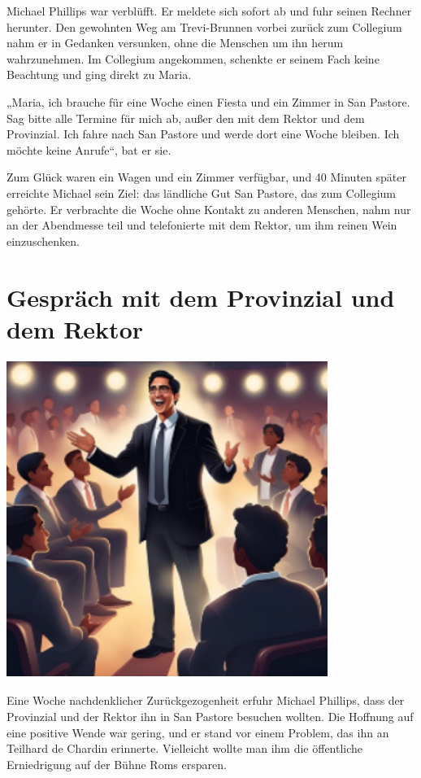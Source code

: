 \documentclass[
]{article}
\begin{document}
Michael Phillips war verblüfft. Er meldete sich sofort ab und fuhr
seinen Rechner herunter. Den gewohnten Weg am Trevi-Brunnen vorbei
zurück zum Collegium nahm er in Gedanken versunken, ohne die Menschen um
ihn herum wahrzunehmen. Im Collegium angekommen, schenkte er seinem Fach
keine Beachtung und ging direkt zu Maria.

„Maria, ich brauche für eine Woche einen Fiesta und ein Zimmer in San
Pastore. Sag bitte alle Termine für mich ab, außer den mit dem Rektor
und dem Provinzial. Ich fahre nach San Pastore und werde dort eine Woche
bleiben. Ich möchte keine Anrufe``, bat er sie.

Zum Glück waren ein Wagen und ein Zimmer verfügbar, und 40 Minuten
später erreichte Michael sein Ziel: das ländliche Gut San Pastore, das
zum Collegium gehörte. Er verbrachte die Woche ohne Kontakt zu anderen
Menschen, nahm nur an der Abendmesse teil und telefonierte mit dem
Rektor, um ihm reinen Wein einzuschenken.

\section{Gespräch mit dem Provinzial und dem
Rektor}\label{gespruxe4ch-mit-dem-provinzial-und-dem-rektor}

\includegraphics[width=4.11093in,height=4.06457in]{media/image12.png}

Eine Woche nachdenklicher Zurückgezogenheit erfuhr Michael Phillips,
dass der Provinzial und der Rektor ihn in San Pastore besuchen wollten.
Die Hoffnung auf eine positive Wende war gering, und er stand vor einem
Problem, das ihn an Teilhard de Chardin erinnerte. Vielleicht wollte man
ihm die öffentliche Erniedrigung auf der Bühne Roms ersparen.
\end{document}
